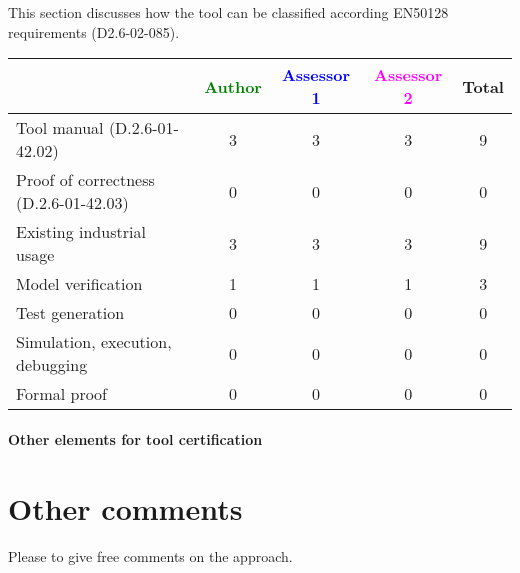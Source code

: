 This section discusses how the tool can be classified according EN50128 requirements (D2.6-02-085).


\begin{tabular}{|l | c | c | c | c|}
\hline
& \textcolor{green}{Author} & \textcolor{blue}{Assessor 1} & \textcolor{magenta}{Assessor 2} & Total \\
\hline 
Tool manual (D.2.6-01-42.02) &3 &3 & 3& 9 \\
\hline
Proof of correctness (D.2.6-01-42.03)   &0 &0 & 0& 0 \\
\hline
Existing industrial  usage  &3 &3 & 3& 9 \\
\hline
Model verification &1 &1 & 1& 3 \\
\hline
Test generation &0 &0 & 0& 0 \\
\hline
Simulation, execution, debugging &0 &0 & 0& 0 \\
\hline
Formal proof &0 &0 & 0& 0 \\
\hline
\end{tabular}

\paragraph{Other elements for tool certification}

\section{Other comments}
Please to  give free comments on the approach.




